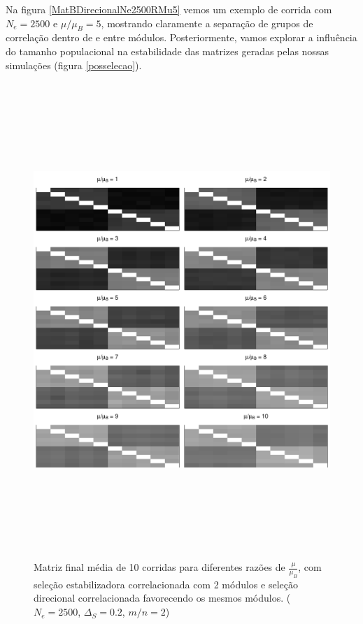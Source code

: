 Na figura \ref{MatBDirecionalNe2500RMu5} vemos um exemplo de corrida com
$N_e = 2500$ e $\mu/\mu_B=5$, mostrando claramente a separação de grupos
de correlação dentro de e entre módulos. 
Posteriormente, vamos explorar a influência do tamanho populacional na
estabilidade das matrizes geradas pelas nossas simulações (figura
\ref{posselecao}). 

\begin{center}
\begin{figure}[htbp]
  \includegraphics[width=150mm, height=180mm]{figuras/MatBDirecRMu}
   \caption{Matriz final média de 10 corridas para diferentes razões de
   $\frac{\mu}{\mu_B}$, com seleção estabilizadora correlacionada com 2
   módulos e seleção direcional correlacionada favorecendo os mesmos
   módulos. ($N_e=2500$, $\Delta_S=0.2$, $m/n=2$)}
  \label{MatBDirecional-RMu}
\end{figure}
\end{center}

